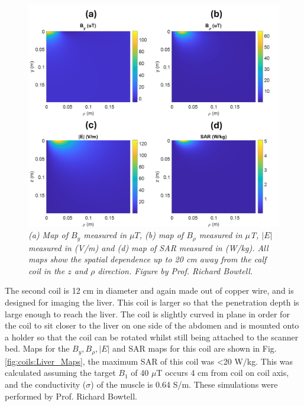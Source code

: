 \begin{figure}[H]
    \centering
    \includegraphics[width=0.8\linewidth]{Figures/Coils/Calf_Maps.png}
    \caption{\textit{(a) Map of $B_y$ measured in $\mu T$, (b) map of $B_\rho$ measured in $\mu$T, $|E|$ measured in (V/m) and (d) map of \ac{SAR} measured in (W/kg). All maps show the spatial dependence up to 20 cm away from the calf coil in the $z$ and $\rho$ direction. Figure by Prof. Richard Bowtell.}}
    \label{fig:coils:Calf_Maps}
\end{figure}

The second coil is 12 cm in diameter and again made out of copper wire, and is designed for imaging the liver. This coil is larger so that the penetration depth is large enough to reach the liver. The coil is slightly curved in plane in order for the coil to sit closer to the liver on one side of the abdomen and is mounted onto a holder so that the coil can be rotated whilst still being attached to the scanner bed. Maps for the $B_y, B_\rho, |E|$ and \ac{SAR} maps for this coil are shown in Fig. \ref{fig:coils:Liver_Maps}, the maximum \ac{SAR} of this coil was <20 W/kg. This was calculated assuming the target $B_1$ of 40 $\mu$T occurs 4 cm from coil on coil axis, and the conductivity ($\sigma$) of the muscle is 0.64 S/m. These simulations were performed by Prof. Richard Bowtell.

